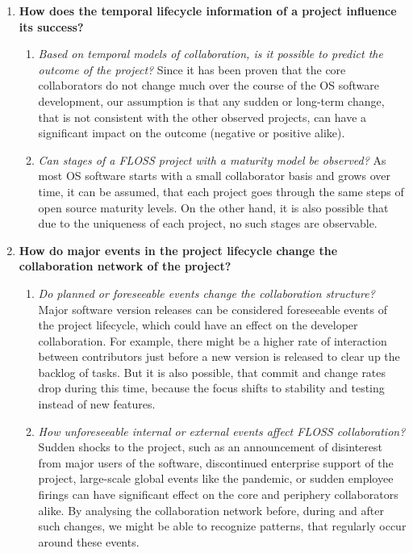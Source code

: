\begin{enumerate}
    \item \textbf{How does the temporal lifecycle information of a project influence its success?}
    
    \begin{enumerate}
        \item \textit{Based on temporal models of collaboration, is it possible to predict the outcome of the project?} Since it has been proven that the core collaborators do not change much over the course of the OS software development, our assumption is that any sudden or long-term change, that is not consistent with the other observed projects, can have a significant impact on the outcome (negative or positive alike).
        \item \textit{Can stages of a FLOSS project with a maturity model be observed?} As most OS software starts with a small collaborator basis and grows over time, it can be assumed, that each project goes through the same steps of open source maturity levels. On the other hand, it is also possible that due to the uniqueness of each project, no such stages are observable. 
    \end{enumerate}

    \item \textbf{How do major events in the project lifecycle change the collaboration network of the project?}
    \begin{enumerate}
        \item \textit{Do planned or foreseeable events change the collaboration structure?} Major software version releases can be considered foreseeable events of the project lifecycle, which could have an effect on the developer collaboration. For example, there might be a higher rate of interaction between contributors just before a new version is released to clear up the backlog of tasks. But it is also possible, that commit and change rates drop during this time, because the focus shifts to stability and testing instead of new features.
        \item \textit{How unforeseeable internal or external events affect FLOSS collaboration?} Sudden shocks to the project, such as an announcement of disinterest from major users of the software, discontinued enterprise support of the project, large-scale global events like the pandemic, or sudden employee firings can have significant effect on the core and periphery collaborators alike. By analysing the collaboration network before, during and after such changes, we might be able to recognize patterns, that regularly occur around these events.
    \end{enumerate}
\end{enumerate}


